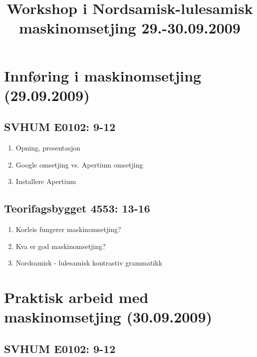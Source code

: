 \documentclass[a4paper,english,12pt]{article}
\begin{document}
\setcounter{secnumdepth}{3}
\setcounter{tocdepth}{3}
\begin{spacing}{0.8}


\newcommand{\tx}{\mbox{t\hspace{-.35em}-}} %




\title{Workshop i Nordsamisk-lulesamisk maskinomsetjing 29.-30.09.2009}

\maketitle

\section{Innføring i maskinomsetjing (29.09.2009)}


\subsection{SVHUM E0102: 9-12}
\begin{enumerate}
\item Opning, presentasjon 
\item Google omsetjing vs. Apertium omsetjing
\item Installere Apertium  %
\end{enumerate}

\subsection{Teorifagsbygget 4553: 13-16}

\begin{enumerate}
\item Korleis fungerer maskinomsetjing?  %
\item Kva er god maskinomsetjing? 
\item Nordsamisk - lulesamisk kontrastiv grammatikk 
\end{enumerate}


\section{Praktisk arbeid med maskinomsetjing  (30.09.2009)}

\subsection{SVHUM E0102: 9-12}


\end{spacing}
\end{document}
